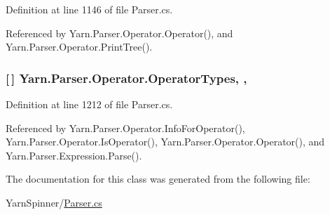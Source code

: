 Definition at line 1146 of file Parser.\-cs.



Referenced by Yarn.\-Parser.\-Operator.\-Operator(), and Yarn.\-Parser.\-Operator.\-Print\-Tree().

\hypertarget{a00145_ad8a4bb1b46dbc3d1b7708e78a2d97e1c}{
\subsubsection[{Operator\-Types}]{ \mbox{[}$\,$\mbox{]} Yarn.\-Parser.\-Operator.\-Operator\-Types\hspace{0.3cm}{\ttfamily [static]}, {\ttfamily [get]}, {\ttfamily [package]}}}\label{a00145_ad8a4bb1b46dbc3d1b7708e78a2d97e1c}


Definition at line 1212 of file Parser.\-cs.



Referenced by Yarn.\-Parser.\-Operator.\-Info\-For\-Operator(), Yarn.\-Parser.\-Operator.\-Is\-Operator(), Yarn.\-Parser.\-Operator.\-Operator(), and Yarn.\-Parser.\-Expression.\-Parse().



The documentation for this class was generated from the following file\-:\begin{DoxyCompactItemize}
\item 
Yarn\-Spinner/\hyperlink{a00316}{Parser.\-cs}\end{DoxyCompactItemize}
